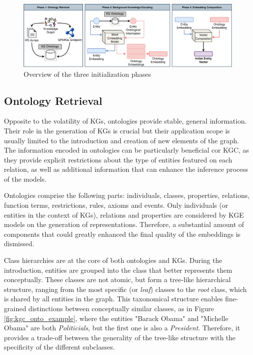 \begin{figure}
    \centering
    \includegraphics[width=\linewidth]{5_kbsintegrationdl/figures/Initialization_phases.eps}
    \caption{Overview of the three initialization phases}
    \label{fig:overview}
\end{figure}


\subsection{Ontology Retrieval}
Opposite to the volatility of KGs, ontologies provide stable, general information. Their role in the generation of KGs is crucial but their application scope is usually limited to the introduction and creation of new elements of the graph. The information encoded in ontologies can be particularly beneficial cor KGC, as they provide explicit restrictions about the type of entities featured on each relation, as well as additional information that can enhance the inference process of the models.

Ontologies comprise the following parts: individuals, classes, properties, relations, function terms, restrictions, rules, axioms and events. Only individuals (or entities in the context of KGs), relations and properties are considered by KGE models on the generation of representations. Therefore, a substantial amount of components that could greatly enhanced the final quality of the embeddings is dismissed.

Class hierarchies are at the core of both ontologies and KGs. During the introduction, entities are grouped into the class that better represents them conceptually. These classes are not atomic, but form a tree-like hierarchical structure, ranging from the most specific (or \textit{leaf}) classes to the \textit{root} class, which is shared by all entities in the graph. This taxonomical structure enables fine-grained distinctions between conceptually similar classes, as in Figure \ref{fig:kgc_onto_example}, where the entities "Barack Obama" and "Michelle Obama" are both \textit{Politicials}, but the first one is also a \textit{President}. Therefore, it provides a trade-off between the generality of the tree-like structure with the specificity of the different subclasses. 

